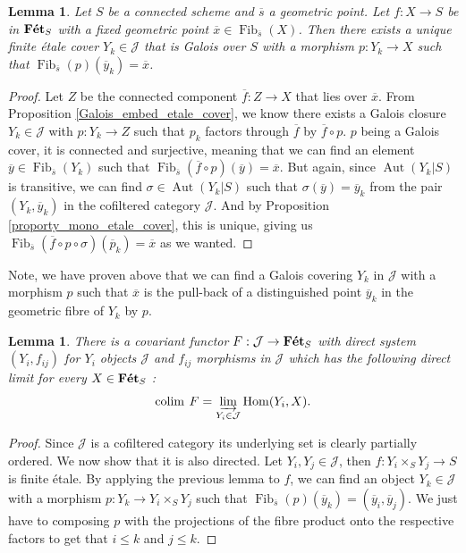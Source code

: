 \documentclass{article}
\theoremstyle{plain}
\newtheorem{lemma}[theorem]{Lemma}
\theoremstyle{definition}
\DeclareMathOperator{\Hom}{Hom}
\DeclareMathOperator{\Fib}{Fib}
\DeclareMathOperator{\Aut}{Aut}
\DeclareMathOperator{\colim}{colim}
\DeclareMathOperator{\Fet}{\bf{F\acute{e}t}}
\begin{document}
\begin{lemma}
\label{making_Galois_cofinal}
    Let $S$ be a connected scheme and $\overline{s}$ a geometric point.
    Let $f:X\rightarrow S$ be in $\Fet_S$ with a fixed geometric point $\overline{x}\in \Fib_{\overline{s}}(X)$.
    Then there exists a unique finite \'etale cover $Y_k\in\mathcal{J}$ that is Galois over $S$ with a morphism $p:Y_k\rightarrow X$ such that $\Fib_{\overline{s}}(p)(\overline{y}_k) =\overline{x}$.
\end{lemma}
\begin{proof}
    Let $Z$ be the connected component $\overline{f}:Z\rightarrow X$ that lies over $\overline{x}$. 
    From Proposition \ref{Galois_embed_etale_cover}, we know there exists a Galois closure $Y_k \in \mathcal{J}$ with $p:Y_k\rightarrow Z$ such that $p_k$ factors through $\overline{f}$ by $\overline{f}\circ p$.
    $p$ being a Galois cover, it is connected and surjective, meaning that we can find an element $\overline{y}\in \Fib_{\overline{s}}(Y_k)$ such that $\Fib_{\overline{s}}(\overline{f}\circ p)(\overline{y}) = \overline{x}$.
    But again, since $\Aut(Y_k|S)$ is transitive, we can find $\sigma\in \Aut(Y_k|S)$ such that $\sigma(\overline{y}) = \overline{y}_k$ from the pair $(Y_k,\overline{y}_k)$ in the cofiltered category $\mathcal{J}$. 
    And by Proposition \ref{proporty_mono_etale_cover}, this is unique, giving us $\Fib_{\overline{s}}(\overline{f}\circ p \circ \sigma)(\overline{p}_k) = \overline{x}$ as we wanted.
\end{proof}

\noindent Note, we have proven above that we can find a Galois covering $Y_k$ in $\mathcal{J}$ with a morphism $p$ such that $\overline{x}$ is the pull-back of a distinguished point $\overline{y}_k$ in the geometric fibre of $Y_k$ by $p$.

\begin{lemma}
\label{direct_system_fibre}
    There is a covariant functor $F:\mathcal{J}\rightarrow \Fet_S$ with direct system $(Y_i,f_{ij})$ for $Y_i$ objects $\mathcal{J}$ and $f_{ij}$ morphisms in $\mathcal{J}$ which has the following direct limit for every $X\in \Fet_S$ : $$ \colim\:F = \varinjlim_{Y_i\in\mathcal{J}}\Hom(Y_i,X).$$
\end{lemma}
\begin{proof}
    Since $\mathcal{J}$ is a cofiltered category its underlying set is clearly partially ordered.
    We now show that it is also directed. 
    Let $Y_i,Y_j\in \mathcal{J}$, then $f:Y_i\times_S Y_j \rightarrow S$ is finite \'etale. 
    By applying the previous lemma to $f$, we can find an object $Y_k\in \mathcal{J}$ with a morphism $p:Y_k\rightarrow Y_i\times_SY_j$ such that $\Fib_{\overline{s}}(p)(\overline{y}_k) = (\overline{y}_i,\overline{y}_j)$. 
    We just have to composing $p$ with the projections of the fibre product onto the respective factors to get that $i\leq k$ and $j\leq k$.
\end{proof}
\end{document}

